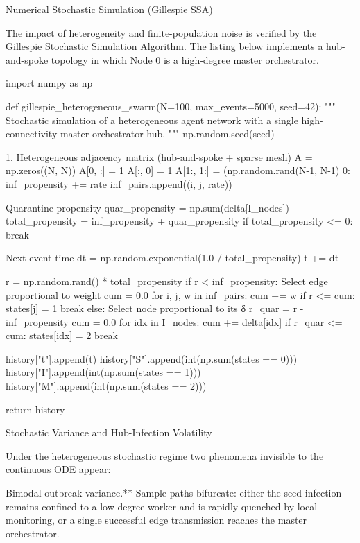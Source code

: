 Numerical Stochastic Simulation (Gillespie SSA)

The impact of heterogeneity and finite-population noise is verified by the Gillespie Stochastic Simulation Algorithm. The listing below implements a hub-and-spoke topology in which Node 0 is a high-degree master orchestrator.

import numpy as np

def gillespie_heterogeneous_swarm(N=100, max_events=5000, seed=42):
    """
    Stochastic simulation of a heterogeneous agent network
    with a single high-connectivity master orchestrator hub.
    """
    np.random.seed(seed)

1. Heterogeneous adjacency matrix (hub-and-spoke + sparse mesh)
    A = np.zeros((N, N))
    A[0, :] = 1
    A[:, 0] = 1
    A[1:, 1:] = (np.random.rand(N-1, N-1)  0:
                    inf_propensity += rate
                    inf_pairs.append((i, j, rate))

Quarantine propensity
        quar_propensity = np.sum(delta[I_nodes])
        total_propensity = inf_propensity + quar_propensity
        if total_propensity <= 0:
            break

Next-event time
        dt = np.random.exponential(1.0 / total_propensity)
        t += dt

        r = np.random.rand() * total_propensity
        if r < inf_propensity:
Select edge proportional to weight
            cum = 0.0
            for i, j, w in inf_pairs:
                cum += w
                if r <= cum:
                    states[j] = 1
                    break
        else:
Select node proportional to its δ
            r_quar = r - inf_propensity
            cum = 0.0
            for idx in I_nodes:
                cum += delta[idx]
                if r_quar <= cum:
                    states[idx] = 2
                    break

        history["t"].append(t)
        history["S"].append(int(np.sum(states == 0)))
        history["I"].append(int(np.sum(states == 1)))
        history["M"].append(int(np.sum(states == 2)))

    return history

Stochastic Variance and Hub-Infection Volatility

Under the heterogeneous stochastic regime two phenomena invisible to the continuous ODE appear:

Bimodal outbreak variance.**  
  Sample paths bifurcate: either the seed infection remains confined to a low-degree worker and is rapidly quenched by local monitoring, or a single successful edge transmission reaches the master orchestrator.

